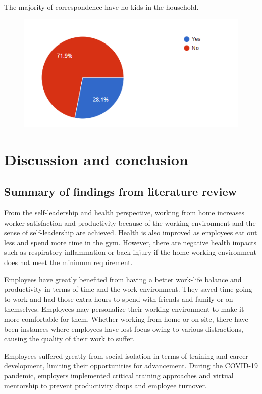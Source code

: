 \documentclass[12pt]{article}
\begin{document}
The majority of correspondence have no kids in the household.
\begin{figure}[h]
    \centering
    \includegraphics[scale=1]{bias_kids.png}
    \label{bias_kids}
\end{figure} 

\section*{Discussion and conclusion}
\subsection*{Summary of findings from literature review}

From the self-leadership and health perspective, working from home increases worker satisfaction and productivity because of the working environment and the sense of self-leadership are achieved. Health is also improved as employees eat out less and spend more time in the gym. However, there are negative health impacts such as respiratory inflammation or back injury if the home working environment does not meet the minimum requirement.

Employees have greatly benefited from having a better work-life balance and productivity in terms of time and the work environment. They saved time going to work and had those extra hours to spend with friends and family or on themselves. Employees may personalize their working environment to make it more comfortable for them. Whether working from home or on-site, there have been instances where employees have lost focus owing to various distractions, causing the quality of their work to suffer.
 
Employees suffered greatly from social isolation in terms of training and career development, limiting their opportunities for advancement. During the COVID-19 pandemic, employers implemented critical training approaches and virtual mentorship to prevent productivity drops and employee turnover.
\end{document}

